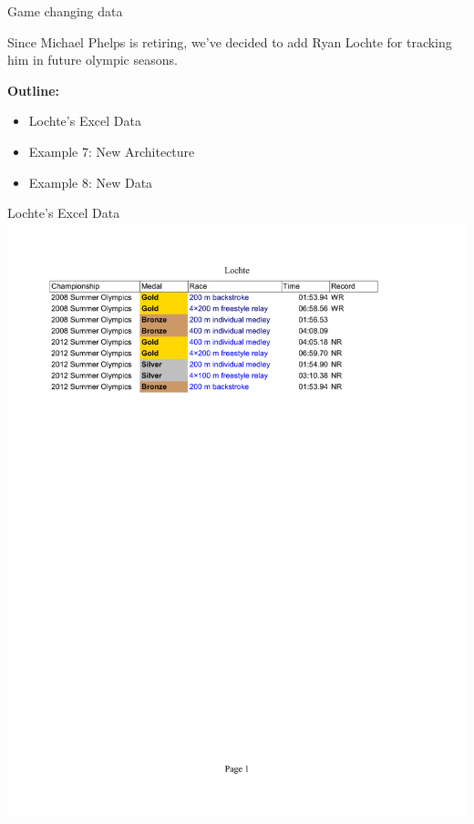 \documentclass{beamer}
\begin{document}
\begin{frame}{Game changing data}

\vspace{.5cm} Since Michael Phelps is retiring, we've decided to add Ryan Lochte for tracking him in future olympic seasons.

\vspace{12pt}
\large {\bf Outline:}
\begin{itemize}
\item Lochte's Excel Data
\item Example 7: New Architecture
\item Example 8: New Data
\end{itemize}

\end{frame}
\begin{frame}{Lochte's Excel Data}
\includegraphics[scale=0.5]{lochte_table.pdf}
\end{frame}
\end{document}
